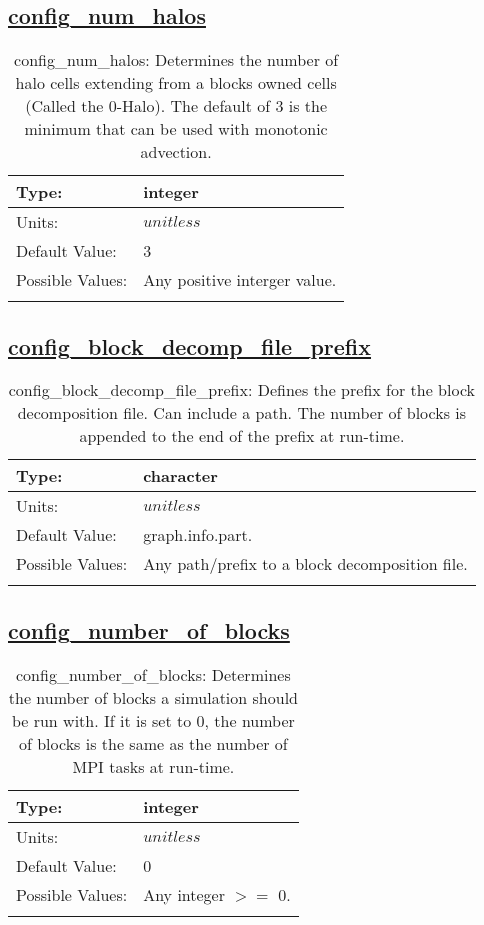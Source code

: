 \subsection[config\_num\_halos]{\hyperref[sec:nm_tab_decomposition]{config\_num\_halos}}
\label{subsec:nm_sec_config_num_halos}
\begin{center}
\begin{longtable}{| p{2.0in} | p{4.0in} |}
    \hline
    Type: & integer \\
    \hline
    Units: & $unitless$ \\
    \hline
    Default Value: & 3 \\
    \hline
    Possible Values: & Any positive interger value. \\
    \hline
    \caption{config\_num\_halos: Determines the number of halo cells extending from a blocks owned cells (Called the 0-Halo). The default of 3 is the minimum that can be used with monotonic advection.}
\end{longtable}
\end{center}
\subsection[config\_block\_decomp\_file\_prefix]{\hyperref[sec:nm_tab_decomposition]{config\_block\_decomp\_file\_prefix}}
\label{subsec:nm_sec_config_block_decomp_file_prefix}
\begin{center}
\begin{longtable}{| p{2.0in} | p{4.0in} |}
    \hline
    Type: & character \\
    \hline
    Units: & $unitless$ \\
    \hline
    Default Value: & graph.info.part. \\
    \hline
    Possible Values: & Any path/prefix to a block decomposition file. \\
    \hline
    \caption{config\_block\_decomp\_file\_prefix: Defines the prefix for the block decomposition file. Can include a path. The number of blocks is appended to the end of the prefix at run-time.}
\end{longtable}
\end{center}
\subsection[config\_number\_of\_blocks]{\hyperref[sec:nm_tab_decomposition]{config\_number\_of\_blocks}}
\label{subsec:nm_sec_config_number_of_blocks}
\begin{center}
\begin{longtable}{| p{2.0in} | p{4.0in} |}
    \hline
    Type: & integer \\
    \hline
    Units: & $unitless$ \\
    \hline
    Default Value: & 0 \\
    \hline
    Possible Values: & Any integer $>=$ 0. \\
    \hline
    \caption{config\_number\_of\_blocks: Determines the number of blocks a simulation should be run with. If it is set to 0, the number of blocks is the same as the number of MPI tasks at run-time.}
\end{longtable}
\end{center}
